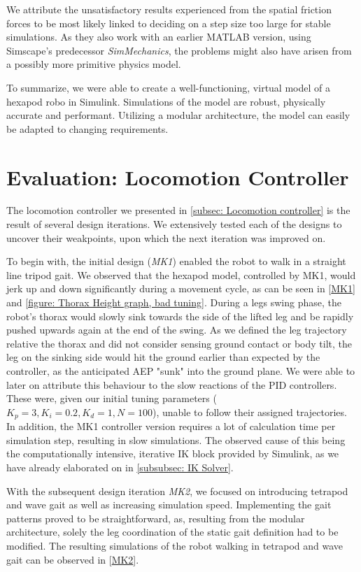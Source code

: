 We attribute the unsatisfactory results \cite{thilderkvist2015motion} experienced from the spatial friction forces to be most likely linked to deciding on a step size too large for stable simulations.
As they also work with an earlier MATLAB version, using Simscape's predecessor \textit{SimMechanics}, the problems might also have arisen from a possibly more primitive physics model.

To summarize, we were able to create a well-functioning, virtual model of a hexapod robo in Simulink.
Simulations of the model are robust, physically accurate and performant.
Utilizing a modular architecture, the model can easily be adapted to changing requirements.
 

\section{Evaluation: Locomotion Controller}
The locomotion controller we presented in \ref{subsec: Locomotion controller} is the result of several design iterations.
We extensively tested each of the designs to uncover their weakpoints, upon which the next iteration was improved on.

To begin with, the initial design (\textit{MK1}) enabled the robot to walk in a straight line tripod gait.
We observed that the hexapod model, controlled by MK1, would jerk up and down significantly during a movement cycle, as can be seen in [\hyperref[vid: MK1]{MK1}] and \ref{figure: Thorax Height graph, bad tuning}.
During a legs swing phase, the robot's thorax would slowly sink towards the side of the lifted leg and be rapidly pushed upwards again at the end of the swing.
As we defined the leg trajectory relative the thorax and did not consider sensing ground contact or body tilt, the leg on the sinking side would hit the ground earlier than expected by the controller, as the anticipated AEP "sunk" into the ground plane.
We were able to later on attribute this behaviour to the slow reactions of the PID controllers.
These were, given our initial tuning parameters ($K_p = 3, K_i = 0.2, K_d = 1, N = 100$), unable to follow their assigned trajectories. 
In addition, the MK1 controller version requires a lot of calculation time per simulation step, resulting in slow simulations.
The observed cause of this being the computationally intensive, iterative IK block provided by Simulink, as we have already elaborated on in \ref{subsubsec: IK Solver}.

With the subsequent design iteration \textit{MK2}, we focused on introducing tetrapod and wave gait as well as increasing simulation speed.
Implementing the gait patterns proved to be straightforward, as, resulting from the modular architecture, solely the leg coordination of the static gait definition had to be modified.
The resulting simulations of the robot walking in tetrapod and wave gait can be observed in [\hyperref[vid: MK1]{MK2}].

